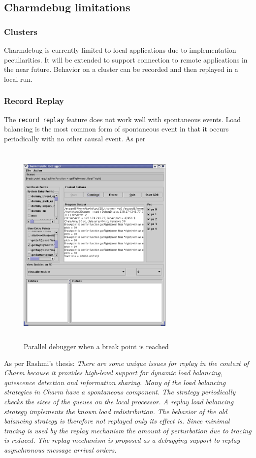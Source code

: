 \documentclass[10pt,dvips]{article}
\begin{document}
\subsection{Charmdebug limitations}

\subsubsection{Clusters}

Charmdebug is currently limited to local applications due to
implementation peculiarities.  It will be extended to support
connection to remote applications in the near future.  Behavior on a
cluster can be recorded and then replayed in a local run.

\subsubsection{Record Replay}
The \texttt{record replay} feature does not work well with spontaneous
events.  Load balancing is the most common form of spontaneous event
in that it occurs periodically with no other causal event. As per

\begin{figure}[]
\includegraphics[scale=0.5,height=4in, width=3in]{figs/snapshot3}
\caption{Parallel debugger when a break point is reached}
\label{snapshot3}
\end{figure}

As per Rashmi's thesis: \textit{ There are some unique issues for
replay in the context of Charm because it provides high-level support
for dynamic load balancing, quiescence detection and information
sharing. Many of the load balancing strategies in Charm have a
spontaneous component. The strategy periodically checks the sizes of
the queues on the local processor. A replay load balancing strategy
implements the known load redistribution. The behavior of the old
balancing strategy is therefore not replayed only its effect is. Since
minimal tracing is used by the replay mechanism the amount of
perturbation due to tracing is reduced. The replay mechanism is
proposed as a debugging support to replay asynchronous message arrival
orders.}
\end{document}
